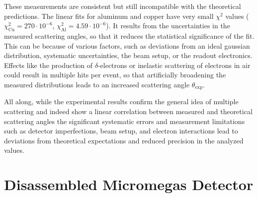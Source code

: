 \documentclass[sn-mathphys-num,iicol]{sn-jnl}
\theoremstyle{thmstyleone}
\theoremstyle{thmstyletwo}
\theoremstyle{thmstylethree}
\begin{document}
These measurements are consistent but still incompatible with the theoretical predictions.
The linear fits for aluminum and copper have very small \(\chi^2\) values (\(\chi^2_{\text{Cu}} = 270 \cdot 10^{-6}\), \(\chi^2_{\text{Al}} = 4.59 \cdot 10^{-6}\)). 
It results from the uncertainties in the measured scattering angles, so that it reduces the statistical significance of the fit. 
This can be because of various factors, such as deviations from an ideal gaussian distribution, systematic uncertainties, the beam setup, or the readout electronics. 
Effects like the production of \(\delta\)-electrons or inelastic scattering of electrons in air could result in multiple hits per event, so that artificially broadening the measured distributions leads to an increased scattering angle \(\theta_{\text{exp}}\).

All along, while the experimental results confirm the general idea of multiple scattering and indeed show a linear correlation between measured 
and theoretical scattering angles the significant systematic errors and measurement limitations such as detector imperfections, beam setup, 
and electron interactions lead to deviations from theoretical expectations and reduced precision in the analyzed values. 

\clearpage\appendix\onecolumn


\section{Disassembled Micromegas Detector}
\renewcommand{\thefigure}{\Alph{section}\arabic{figure}}
\setcounter{figure}{0}
\renewcommand{\thetable}{\Alph{section}\arabic{table}}
\setcounter{table}{0}
\end{document}
